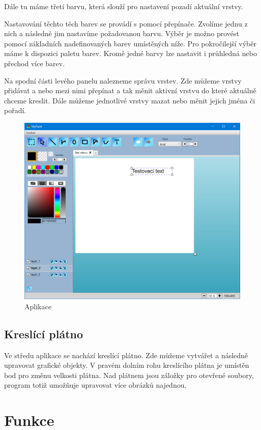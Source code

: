 \documentclass[
  field=inf,
  biblatex,
  glossaries,
  index
]{kidiplom}
\begin{document}
Dále tu máme třetí barvu, která slouží pro nastavení pozadí aktuální vrstvy.

Nastavování těchto těch barev se provádí s pomocí přepínače. Zvolíme jednu z nich a následně jim nastavíme požadovanou barvu. Výběr je možno provést pomocí základních nadefinovaných barev umístěných níže. Pro pokročilejší výběr máme k dispozici paletu barev. Kromě jedné barvy lze nastavit i průhledná nebo přechod více barev.

Na spodní části levého panelu nalezneme správu vrstev. Zde můžeme vrstvy přidávat a nebo mezi nimi přepínat a tak měnit aktivní vrstvu do které aktuálně chceme kreslit. Dále můžeme jednotlivé vrstvy mazat nebo měnit jejich jména či pořadí.

\begin{figure}
\includegraphics[width=15cm]{img/program}
\caption{Aplikace}
\end{figure}  

\subsection{Kreslící plátno}

Ve středu aplikace se nachází kreslící plátno. Zde můžeme vytvářet a následně upravovat grafické objekty. V pravém dolním rohu kreslícího plátna je umístěn bod pro změnu velkosti plátna. Nad plátnem jsou záložky pro otevřené soubory, program totiž umožňuje upravovat více obrázků najednou.


\section{Funkce}
\end{document}
